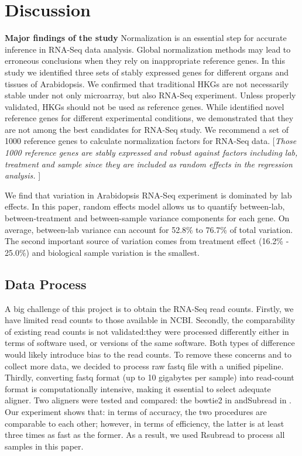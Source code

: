 \documentclass[11pt, a4paper]{article}
\begin{document}
  \section{Discussion}
  \textbf{Major findings of the study}
  Normalization is an essential step for accurate inference in RNA-Seq data analysis. Global normalization methods may lead to erroneous conclusions when they rely on inappropriate reference genes. In this study we identified three sets of stably expressed genes for different organs and tissues of Arabidopsis. We confirmed that traditional HKGs are not necessarily stable under not only microarray, but also RNA-Seq experiment. Unless properly validated, HKGs should not be used as reference genes. While \cite{czechowski2005genome} identified novel reference genes for different experimental conditions, we demonstrated that they are not among the best candidates for RNA-Seq study. We recommend a set of 1000 reference genes to calculate normalization factors for RNA-Seq data.   [\textit{Those 1000 reference genes are stably expressed and robust against factors including lab, treatment and sample since they are included as random effects in the regression analysis.  }]
   
   We find that variation in Arabidopsis RNA-Seq experiment is dominated by lab effects. In this paper, random effects model allows us to quantify  between-lab, between-treatment and between-sample variance components for each gene.
On average, between-lab variance can account for 52.8\% to 76.7\% of total variation. The second important source of variation comes from treatment effect (16.2\% - 25.0\%) and biological sample variation is the smallest. 


  \subsection{Data Process}
  A big challenge of this project is to obtain the RNA-Seq read counts. Firstly, we have limited read counts to those available in NCBI. Secondly, the comparability of existing read counts is not validated:they were processed differently either in terms of software used, or versions of the same software. Both types of difference would likely introduce bias to the read counts. To remove these concerns and to collect more data, we decided to process raw fastq file with a unified pipeline. Thirdly, converting fastq format (up to 10 gigabytes per sample)  into read-count format is computationally intensive, making it essential to select adequate aligner. Two aligners were tested and compared: the bowtie2 in \cite{anders2013count} andSubread in \cite{liao2013subread}.  Our experiment shows that:  in terms of accuracy, the two procedures are comparable to each other; however, in terms of efficiency, the latter is at least three times as fast as the former. As a result, we used Rsubread to process all samples in this paper.
\end{document}
